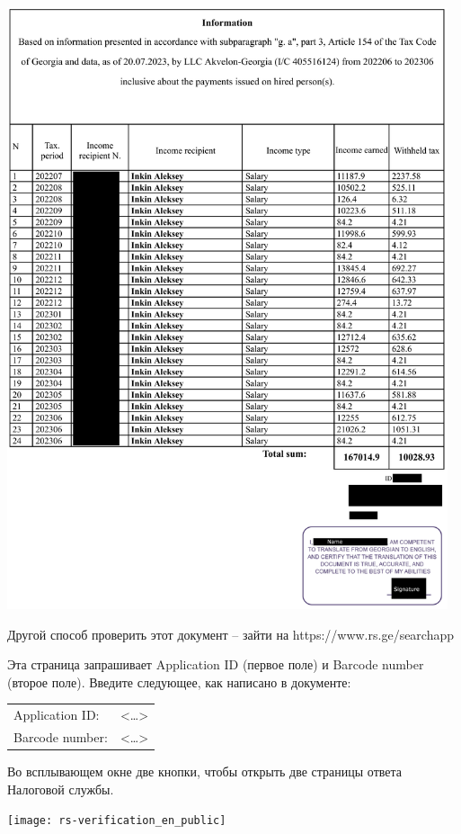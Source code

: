\begin{center}
    \includegraphics[width=35em]{rs-2_en_public}
\end{center}



Другой способ проверить этот документ -- зайти на
https://www.rs.ge/searchapp

Эта страница запрашивает Application ID (первое поле)
и Barcode number (второе поле).
Введите следующее, как написано в документе:

\begin{tabular}{ll}
    Application ID: & <\dots> \\
    Barcode number: & <\dots> \\
\end{tabular}


Во всплывающем окне две кнопки, чтобы открыть две страницы ответа Налоговой службы.

\begin{center}
    \texttt{[image: rs-verification\_en\_public]}
\end{center}

